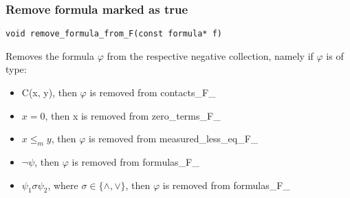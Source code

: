 \documentclass{article}
\begin{document}
			\subsubsection*{Remove formula marked as true}
				\begin{lstlisting}
void remove_formula_from_F(const formula* f)
				\end{lstlisting}
				Removes the formula $\varphi$ from the respective negative collection, namely
				if $\varphi$ is of type:
				\begin{itemize}
					\item C(x, y), then $\varphi$ is removed from contacts\_F\_
					\item $x = 0$, then x is removed from zero\_terms\_F\_
					\item $x \le_m y$, then $\varphi$ is removed from measured\_less\_eq\_F\_
					\item $\neg \psi$, then $\varphi$ is removed from formulas\_F\_
					\item $\psi_1 \sigma \psi_2$, where $\sigma \in \{\wedge, \vee\}$, then $\varphi$ is removed from formulas\_F\_
				\end{itemize}

	\newpage
\end{document}
